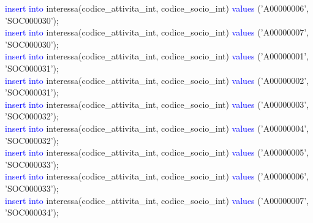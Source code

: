 \documentclass{article}
\begin{document}
\begin{flushleft}
{        \hspace*{0.5em}\textcolor{blue}{insert into} interessa(codice\_attivita\_int, codice\_socio\_int) \textcolor{blue}{values} \hspace*{0.5em}('A00000006', 'SOC000030'); \\
        \hspace*{0.5em}\textcolor{blue}{insert into} interessa(codice\_attivita\_int, codice\_socio\_int) \textcolor{blue}{values} \hspace*{0.5em}('A00000007', 'SOC000030'); \\
        \hspace*{0.5em}\textcolor{blue}{insert into} interessa(codice\_attivita\_int, codice\_socio\_int) \textcolor{blue}{values} \hspace*{0.5em}('A00000001', 'SOC000031'); \\
        \hspace*{0.5em}\textcolor{blue}{insert into} interessa(codice\_attivita\_int, codice\_socio\_int) \textcolor{blue}{values} \hspace*{0.5em}('A00000002', 'SOC000031'); \\
        \hspace*{0.5em}\textcolor{blue}{insert into} interessa(codice\_attivita\_int, codice\_socio\_int) \textcolor{blue}{values} \hspace*{0.5em}('A00000003', 'SOC000032'); \\
        \hspace*{0.5em}\textcolor{blue}{insert into} interessa(codice\_attivita\_int, codice\_socio\_int) \textcolor{blue}{values} \hspace*{0.5em}('A00000004', 'SOC000032'); \\
        \hspace*{0.5em}\textcolor{blue}{insert into} interessa(codice\_attivita\_int, codice\_socio\_int) \textcolor{blue}{values} \hspace*{0.5em}('A00000005', 'SOC000033'); \\
        \hspace*{0.5em}\textcolor{blue}{insert into} interessa(codice\_attivita\_int, codice\_socio\_int) \textcolor{blue}{values} \hspace*{0.5em}('A00000006', 'SOC000033'); \\
        \hspace*{0.5em}\textcolor{blue}{insert into} interessa(codice\_attivita\_int, codice\_socio\_int) \textcolor{blue}{values} \hspace*{0.5em}('A00000007', 'SOC000034'); \\
}
\end{flushleft}
\end{document}
